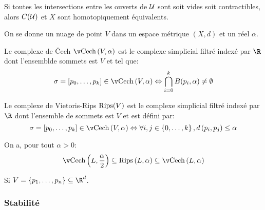 \begin{thm}
	Si toutes les intersections entre les ouverts de $\mathcal{U}$ sont soit vides soit contractibles, alors $C(\mathcal{U})$ et $X$ sont homotopiquement équivalents.
\end{thm}

On se donne un nuage de point $V$ dans un espace métrique $(X, d)$ et un réel $\alpha$.

\begin{definition}
	Le complexe de Čech $\cech\left(V, \alpha\right)$ est le complexe simplicial
	filtré indexé par $\R$ dont l'ensemblde sommets est $V$ et tel que:
	\begin{equation*}
		\sigma = \left[p_{0}, \ldots, p_{k}\right] \in \cech\left(V, \alpha\right) \Leftrightarrow \bigcap_{i = 0}^{k} B(p_{i}, \alpha) \neq \emptyset
	\end{equation*}
\end{definition}

\begin{definition}
	Le complexe de Vietoris-Rips $\operatorname{Rips}(V)$ est le complexe simplicial filtré indexé par $\R$ dont l'ensemble de sommets est $V$
	et est défini par:
	\begin{equation*}
		\sigma = \left[p_{0}, \ldots, p_{k}\right] \in \cech\left(V, \alpha\right) \Leftrightarrow \forall i, j \in \left\{0, \ldots, k\right\}, d\left(p_{i}, p_{j}\right) \leq \alpha
	\end{equation*}
\end{definition}

\begin{proposition}
	On a, pour tout $\alpha > 0$:
	\begin{equation*}
		\cech\left(L, \frac{\alpha}{2}\right) \subseteq \rips\left(L, \alpha\right) \subseteq \cech\left(L, \alpha\right)
	\end{equation*}
\end{proposition}

\begin{definition}
	Si $V = \{p_{1}, \ldots, p_{n}\} \subseteq \R^{d}$.
\end{definition}

\subsubsection{Stabilité}














